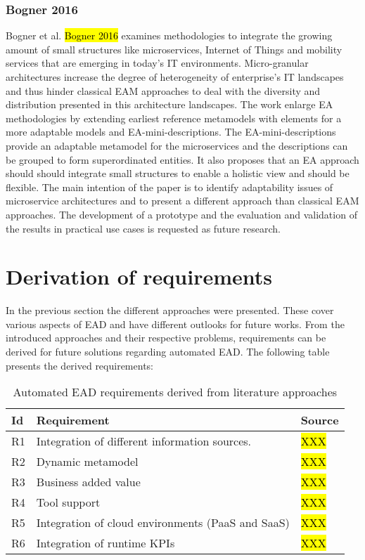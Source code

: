 \subsubsection{Bogner 2016}
Bogner et al. \hl{Bogner 2016} examines methodologies to integrate the growing amount of small structures like microservices, Internet of Things and mobility services that are emerging in today's IT environments. Micro-granular architectures increase the degree of heterogeneity of enterprise's IT landscapes and thus hinder classical EAM approaches to deal with the diversity and distribution presented in this architecture landscapes. The work enlarge EA methodologies by extending earliest reference metamodels with elements for a more adaptable models and EA-mini-descriptions. The EA-mini-descriptions provide an adaptable metamodel for the microservices and the descriptions can be grouped to form superordinated entities. It also proposes that an EA approach should should integrate small structures to enable a holistic view and should be flexible. The main intention of the paper is to identify adaptability issues of microservice architectures and to present a different approach than classical EAM approaches. The development of a prototype and the evaluation and validation of the results in practical use cases is requested as future research.

\section{Derivation of requirements}

In the previous section the different approaches were presented. These cover various aspects of EAD and have different outlooks for future works. From the introduced approaches and their respective problems, requirements can be derived for future solutions regarding automated EAD. The following table presents the derived requirements:

\begin{table}[htpb]
  \caption[Automated EAD requirements derived from literature approaches]{Automated EAD requirements derived from literature approaches}\label{tab:sample}
  \centering
  \begin{tabular}{l l l}
    \toprule
      Id & Requirement & Source\\
    \midrule
      R1 & Integration of different information sources. & \hl{XXX}\\
      R2 & Dynamic metamodel & \hl{XXX}\\
      R3 & Business added value & \hl{XXX}\\
      R4 & Tool support & \hl{XXX}\\
      R5 & Integration of cloud environments (PaaS and SaaS) & \hl{XXX}\\
      R6 & Integration of runtime KPIs & \hl{XXX}\\
    \bottomrule
  \end{tabular}
\end{table}

